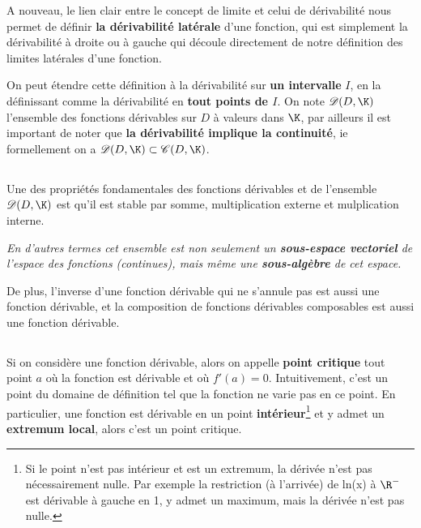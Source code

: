 A nouveau, le lien clair entre le concept de limite et celui de dérivabilité nous permet de définir \textbf{la dérivabilité latérale} d'une fonction, qui est simplement la dérivabilité à droite ou à gauche qui découle directement de notre définition des limites latérales d'une fonction.\<

On peut étendre cette définition à la dérivabilité sur \textbf{un intervalle} \(I\), en la définissant comme la dérivabilité en \textbf{tout points de \(I\)}.\+
On note \(\mathscr{D}(D, \K)\) l'ensemble des fonctions dérivables sur \(D\) à valeurs dans \(\K\), par ailleurs il est important de noter que \textbf{la dérivabilité implique la continuité}, ie formellement on a \(\mathscr{D}(D, \K) \subset \mathscr{C}(D, \K)\).

\subsection*{}

Une des propriétés fondamentales des fonctions dérivables et de l'ensemble \(\mathscr{D}(D, \K)\) est qu'il est stable par somme, multiplication externe et mulplication interne.
\begin{center}
   \textit{
      En d'autres termes cet ensemble est non seulement un \textbf{sous-espace vectoriel} de l'espace des fonctions (continues), mais même une \textbf{sous-algèbre} de cet espace.
   }
\end{center}
De plus, l'inverse d'une fonction dérivable qui ne s'annule pas est aussi une fonction dérivable, et la composition de fonctions dérivables composables est aussi une fonction dérivable.

\subsection*{}

Si on considère une fonction dérivable, alors on appelle \textbf{point critique} tout point \(a\) où la fonction est dérivable et où \(f'(a) = 0\). Intuitivement, c'est un point du domaine de définition tel que la fonction ne varie pas en ce point.\+
En particulier, une fonction est dérivable en un point \textbf{intérieur}\footnote[1]{Si le point n'est pas intérieur et est un extremum, la dérivée n'est pas nécessairement nulle. Par exemple la restriction (à l'arrivée) de ln(x) à \(\R^-\) est dérivable à gauche en 1, y admet un maximum, mais la dérivée n'est pas nulle.} et y admet un \textbf{extremum local}, alors c'est un point critique.\<

